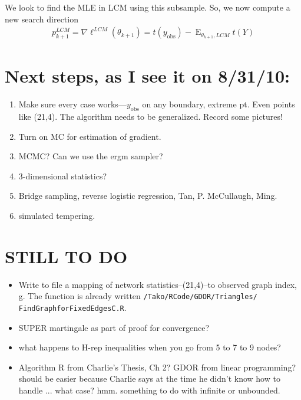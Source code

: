 \documentclass{amsbook}
\DeclareMathOperator{\E}{E}
\newcommand{\yobs}{y_{\textrm{obs}}}
\theoremstyle{definition}
\theoremstyle{remark}
\begin{document}
We look to find the MLE in LCM using this subsample.  So, we now compute a new search 
direction
\begin{align*}
	p_{k+1}^{LCM} = \nabla \ell^{LCM}(\theta_{k+1}) = t(\yobs) - \E_{\theta_{k+1}, 
LCM}t(Y)
\end{align*}

\newpage
\section{Next steps, as I see it on 8/31/10:}
\begin{enumerate}
\item Make sure every case works---$\yobs$ on any boundary, extreme pt.  Even points 
like (21,4).  The algorithm needs to be generalized.  Record some pictures!
\item Turn on MC for estimation of gradient.  
\item MCMC?  Can we use the ergm sampler?
\item 3-dimensional statistics?
\item Bridge sampling, reverse logistic regression, Tan, P. McCullaugh, Ming.
\item simulated tempering.
\end{enumerate}

\section{STILL TO DO}

\begin{itemize}
\item Write to file a mapping of network statistics--(21,4)--to observed graph index, 
g.  The function is already written \texttt{/Tako/RCode/GDOR/Triangles/
FindGraphforFixedEdgesC.R}.
\item SUPER martingale as part of proof for convergence?
\item what happens to H-rep inequalities when you go from 5 to 7 to 9 nodes?
\item Algorithm R from Charlie's Thesis, Ch 2?  GDOR from linear programming?  should 
be easier because Charlie says at the time he didn't know how to handle ... what case?  
hmm.  something to do with infinite or unbounded.
\end{itemize}





\end{document}
